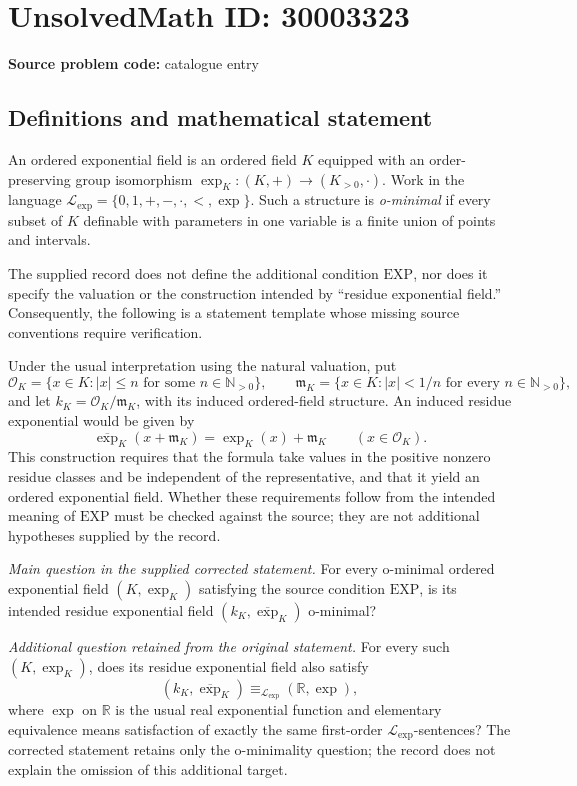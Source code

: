 \documentclass[11pt]{article}
\newcommand{\N}{\mathbb{N}}
\newcommand{\R}{\mathbb{R}}
\begin{document}
\section*{UnsolvedMath ID: 30003323}
\textbf{Source problem code:} catalogue entry
\subsection{Definitions and mathematical statement}
An ordered exponential field is an ordered field \(K\) equipped with an order-preserving group isomorphism \(\exp_K:(K,+)\to(K_{>0},\cdot)\). Work in the language \(\mathcal L_{\exp}=\{0,1,+,-,\cdot,<,\exp\}\). Such a structure is \emph{o-minimal} if every subset of \(K\) definable with parameters in one variable is a finite union of points and intervals.

The supplied record does not define the additional condition \(\mathrm{EXP}\), nor does it specify the valuation or the construction intended by ``residue exponential field.'' Consequently, the following is a statement template whose missing source conventions require verification.

Under the usual interpretation using the natural valuation, put
\[
\mathcal O_K=\{x\in K: |x|\le n\text{ for some }n\in\N_{>0}\},\qquad
\mathfrak m_K=\{x\in K: |x|<1/n\text{ for every }n\in\N_{>0}\},
\]
and let \(k_K=\mathcal O_K/\mathfrak m_K\), with its induced ordered-field structure. An induced residue exponential would be given by
\[
\overline{\exp}_K(x+\mathfrak m_K)=\exp_K(x)+\mathfrak m_K\qquad(x\in\mathcal O_K).
\]
This construction requires that the formula take values in the positive nonzero residue classes and be independent of the representative, and that it yield an ordered exponential field. Whether these requirements follow from the intended meaning of \(\mathrm{EXP}\) must be checked against the source; they are not additional hypotheses supplied by the record.

\emph{Main question in the supplied corrected statement.} For every o-minimal ordered exponential field \((K,\exp_K)\) satisfying the source condition \(\mathrm{EXP}\), is its intended residue exponential field \((k_K,\overline{\exp}_K)\) o-minimal?

\emph{Additional question retained from the original statement.} For every such \((K,\exp_K)\), does its residue exponential field also satisfy
\[
(k_K,\overline{\exp}_K)\equiv_{\mathcal L_{\exp}}(\R,\exp),
\]
where \(\exp\) on \(\R\) is the usual real exponential function and elementary equivalence means satisfaction of exactly the same first-order \(\mathcal L_{\exp}\)-sentences? The corrected statement retains only the o-minimality question; the record does not explain the omission of this additional target.
\end{document}
